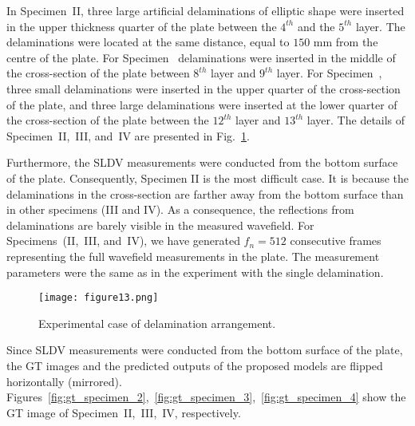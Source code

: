 \begin{sloppypar}
	In Specimen~II, three large artificial delaminations of elliptic shape were inserted in the upper thickness quarter of the plate between the \(4^{th}\) and the \(5^{th}\) layer.
	The delaminations were located at the same distance, equal to \(150\) mm from the centre of the plate.
	For Specimen~ delaminations were inserted in the middle of the cross-section of the plate between \(8^{th}\) layer and \(9^{th}\) layer.
	For Specimen~, three small delaminations were inserted in the upper quarter of the cross-section of the plate, and three large delaminations were inserted at the lower quarter of the cross-section of the plate between the \(12^{th}\) layer and \(13^{th}\) layer.
	The details of Specimen~II,~III, and~IV are presented in Fig.~\ref{fig:plate_delam_arrangment}.
	
	Furthermore, the SLDV measurements were conducted from the bottom surface of the plate. 
	Consequently, Specimen II is the most difficult case.
	It is because the delaminations in the cross-section are farther away from the bottom surface than in other specimens (III and IV).
	As a consequence, the reflections from delaminations are barely visible in the measured wavefield.
	For Specimens~(II,~III, and~IV),  we have generated \(f_n=512\) consecutive frames representing the full wavefield measurements in the plate.
	The measurement parameters were the same as in the experiment with the single delamination.
	\begin{figure}[!ht]
		\centering
		\texttt{[image: figure13.png]}
		\caption{Experimental case of delamination arrangement.}
		\label{fig:plate_delam_arrangment}
	\end{figure}
	
	Since SLDV measurements were conducted from the bottom surface of the plate, the GT images and the predicted outputs of the proposed models are flipped horizontally (mirrored).
	Figures~\ref{fig:gt_specimen_2},~\ref{fig:gt_specimen_3},~\ref{fig:gt_specimen_4} show the GT image of Specimen~II,~III,~IV, respectively.


\end{sloppypar}
